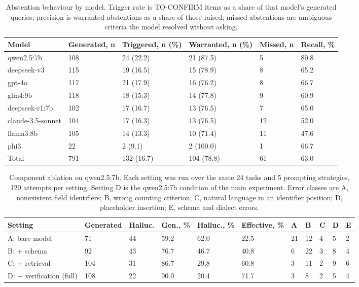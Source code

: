 \documentclass[applsci,article,submit,pdftex,oneauthor]{Definitions/mdpi}
\begin{document}
\begin{table}[H]
\caption{Abstention behaviour by model. Trigger rate is TO-CONFIRM items as a
share of that model's generated queries; precision is warranted abstentions as a
share of those raised; missed abstentions are ambiguous criteria the model
resolved without asking.}
\label{tab:abstain}
\centering
\footnotesize
\setlength{\tabcolsep}{5pt}
\begin{tabular*}{\linewidth}{@{\extracolsep{\fill}}llllll@{}}
\toprule
Model & Generated, n & Triggered, n (\%) & Warranted, n (\%) & Missed, n & Recall, \%\\
\midrule
qwen2.5:7b        & 108 & 24 (22.2) & 21 (87.5) & 5  & 80.8\\
deepseek-v3       & 115 & 19 (16.5) & 15 (78.9) & 8  & 65.2\\
gpt-4o            & 117 & 21 (17.9) & 16 (76.2) & 8  & 66.7\\
glm4:9b           & 118 & 18 (15.3) & 14 (77.8) & 9  & 60.9\\
deepseek-r1:7b    & 102 & 17 (16.7) & 13 (76.5) & 7  & 65.0\\
claude-3.5-sonnet & 104 & 17 (16.3) & 13 (76.5) & 12 & 52.0\\
llama3:8b         & 105 & 14 (13.3) & 10 (71.4) & 11 & 47.6\\
phi3              & 22  & 2 (9.1)   & 2 (100.0) & 1  & 66.7\\
\midrule
Total             & 791 & 132 (16.7) & 104 (78.8) & 61 & 63.0\\
\bottomrule
\end{tabular*}
\end{table}

\begin{table}[H]
\caption{Component ablation on qwen2.5:7b. Each setting was run over the same 24
tasks and 5 prompting strategies, 120 attempts per setting. Setting D is the
qwen2.5:7b condition of the main experiment. Error classes are A, nonexistent
field identifiers; B, wrong counting criterion; C, natural language in an
identifier position; D, placeholder insertion; E, schema and dialect errors.}
\label{tab:ablation}
\centering
\footnotesize
\setlength{\tabcolsep}{4pt}
\begin{tabular*}{\linewidth}{@{\extracolsep{\fill}}lllllllllll@{}}
\toprule
Setting & Generated & Halluc. & Gen., \% & Halluc., \% & Effective, \% & A & B & C & D & E\\
\midrule
A: bare model            & 71  & 44 & 59.2 & 62.0 & 22.5 & 21 & 12 & 4 & 5 & 2\\
B: + schema              & 92  & 43 & 76.7 & 46.7 & 40.8 & 6  & 22 & 3 & 8 & 4\\
C: + retrieval           & 104 & 31 & 86.7 & 29.8 & 60.8 & 3  & 11 & 2 & 9 & 6\\
D: + verification (full) & 108 & 22 & 90.0 & 20.4 & 71.7 & 3  & 8  & 2 & 5 & 4\\
\bottomrule
\end{tabular*}
\end{table}
\end{document}
